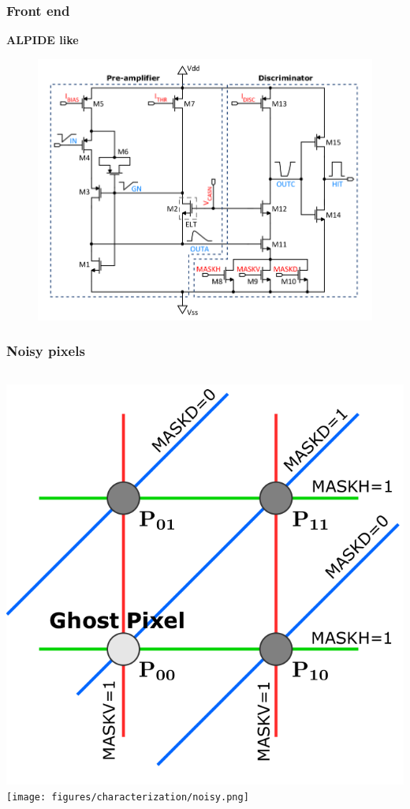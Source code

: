     \begin{frame}
        \frametitle{Front end}
            \textbf{ALPIDE like}
            \begin{figure}[h!]
                \centering
                \includegraphics[width=.8\linewidth]{figures/Monopix1/Monopix1_FE_circuit.png}        
            \end{figure}
    \end{frame}     


    \begin{frame}
        \frametitle{Noisy pixels}
        \begin{columns}
                \centering
                \includegraphics[width=.8\linewidth]{figures/Monopix1/masking_scheme.png}        
            \texttt{[image: figures/characterization/noisy.png]}
        \end{columns}
    \end{frame}    